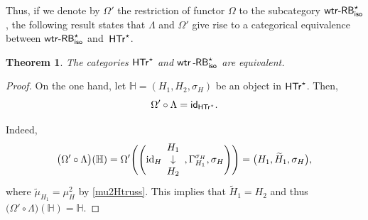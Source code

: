 \documentclass[pdftex]{sigma}
\numberwithin{equation}{section}
\newtheorem{Theorem}{Theorem}[section]
\begin{document}
Thus, if we denote by $\Omega'$ the restriction of functor $\Omega$ to the subcategory ${\sf wtr}\textnormal{-}{\sf RB}^{\star}_{{\sf iso}}$, the following result states that $\Lambda$ and $\Omega'$ give rise to a categorical equivalence between ${\sf wtr}\textnormal{-}{\sf RB}^{\star}_{{\sf iso}}$ and~${\sf HTr}^{\star}$.
\begin{Theorem}\label{catequivHTr}
The categories $\sf{HTr}^{\star}$ and ${\sf wtr}$-${\sf RB}^{\star}_{{\sf iso}}$ are equivalent.
\end{Theorem}
\begin{proof}On the one hand, let $\mathbb{H}=(H_{1},H_{2},\sigma_{H})$ be an object in $\sf{HTr}^{\star}$. Then,
\[\Omega'\circ\Lambda={\sf id}_{\sf{HTr}^{\star}}.\]

Indeed,
\begin{align*}
\bigl(\Omega'\circ\Lambda\bigr)(\mathbb{H})=\Omega'\Biggl(\Biggl({\rm id}_{H}\begin{array}{c}H_{1}\\\downarrow\\H_{2}\end{array},\Gamma_{H_{1}}^{\sigma_{H}},\sigma_{H}\Biggr)\Biggr)=\bigl(H_{1},\widetilde{H}_{1},\sigma_{H}\bigr),
\end{align*}
where $\widetilde{\mu}_{H_{1}}=\mu_{H}^{2}$ by \eqref{mu2Htruss}. This implies that $\widetilde{H}_{1}=H_{2}$ and thus $\bigl(\Omega'\circ\Lambda\bigr)(\mathbb{H})=\mathbb{H}$.


\end{proof}
\end{document}
